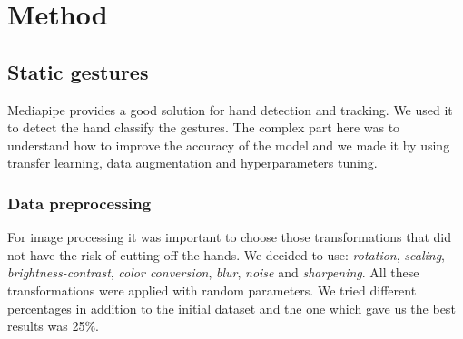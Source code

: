 \documentclass[10pt,twocolumn,letterpaper]{article}
\begin{document}
\section{Method}
\subsection{Static gestures}
Mediapipe provides a good solution for hand detection and tracking. We used it to detect the hand classify the gestures.
The complex part here was to understand how to improve the accuracy of the model and we made it by using transfer learning, data augmentation and hyperparameters tuning.
\subsubsection{Data preprocessing}
For image processing it was important to choose those transformations that did not have the risk of cutting off the hands. We decided to use: \textit{rotation}, \textit{scaling}, \textit{brightness-contrast}, \textit{color conversion}, \textit{blur}, \textit{noise} and \textit{sharpening}. All these transformations were applied with random parameters.
We tried different percentages in addition to the initial dataset and the one which gave us the best results was 25\%.  
\end{document}
